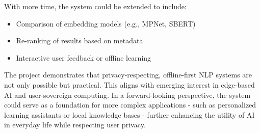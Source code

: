 With more time, the system could be extended to include:

\begin{itemize}
    \item Comparison of embedding models (e.g., MPNet, SBERT)
    \item Re-ranking of results based on metadata
    \item Interactive user feedback or offline learning
\end{itemize}

The project demonstrates that privacy-respecting, offline-first NLP systems are not only possible but practical. This aligns with emerging interest in edge-based AI and user-sovereign computing.
In a forward-looking perspective, the system could serve as a foundation for more complex applications - such as personalized learning assistants or local knowledge bases - 
further enhancing the utility of AI in everyday life while respecting user privacy.
